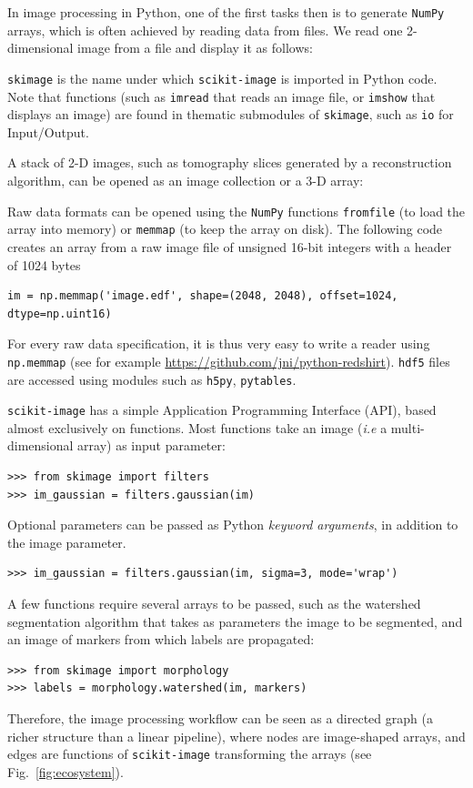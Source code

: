 \documentclass[twocolumn]{bmcart}%
\begin{document}
In image processing in Python, one of the first tasks then is to generate
\texttt{NumPy} arrays, which is often achieved by reading data from files. We
read one 2-dimensional image from a file and display it as follows:

 

\texttt{skimage} is the name under which \texttt{scikit-image} is imported in
Python code. Note that functions (such as \texttt{imread} that reads an image
file, or \texttt{imshow} that displays an image) are found in thematic submodules of
\texttt{skimage}, such as \texttt{io} for Input/Output.

A stack of 2-D images, such as tomography slices generated by a reconstruction algorithm, can be opened as an image collection or a 3-D array:

Raw data formats can be opened using the \texttt{NumPy} functions
\texttt{fromfile} (to load the array into memory) or \texttt{memmap} (to
keep the array on disk). The following code creates an array from a
raw image file of unsigned 16-bit integers with a header of 1024 bytes 
\begin{lstlisting}
im = np.memmap('image.edf', shape=(2048, 2048), offset=1024, dtype=np.uint16)
\end{lstlisting}
For every raw data specification, it is thus very easy to write a reader
using \texttt{np.memmap} (see for example
\url{https://github.com/jni/python-redshirt}). 
\texttt{hdf5} files are accessed using modules such as \texttt{h5py}, \texttt{pytables}.

\texttt{scikit-image} has a simple Application Programming Interface
(API), based almost exclusively on
functions. Most functions take an image (\emph{i.e} a multi-dimensional
array) as input parameter:
\begin{lstlisting}
>>> from skimage import filters
>>> im_gaussian = filters.gaussian(im)
\end{lstlisting}

Optional parameters can be passed as Python \emph{keyword arguments},
in addition to the image parameter.
\begin{lstlisting}
>>> im_gaussian = filters.gaussian(im, sigma=3, mode='wrap')
\end{lstlisting}
A few functions require several arrays to be passed, such as the
watershed segmentation algorithm that takes as parameters the image to be
segmented, and an image of markers from which labels are propagated:
\begin{lstlisting}
>>> from skimage import morphology
>>> labels = morphology.watershed(im, markers)
\end{lstlisting}
Therefore, the image processing workflow can be seen as a directed graph
(a richer structure than a linear pipeline), where nodes are image-shaped arrays, and
edges are functions of \texttt{scikit-image} transforming the arrays (see
Fig.~\ref{fig:ecosystem}).
\end{document}
